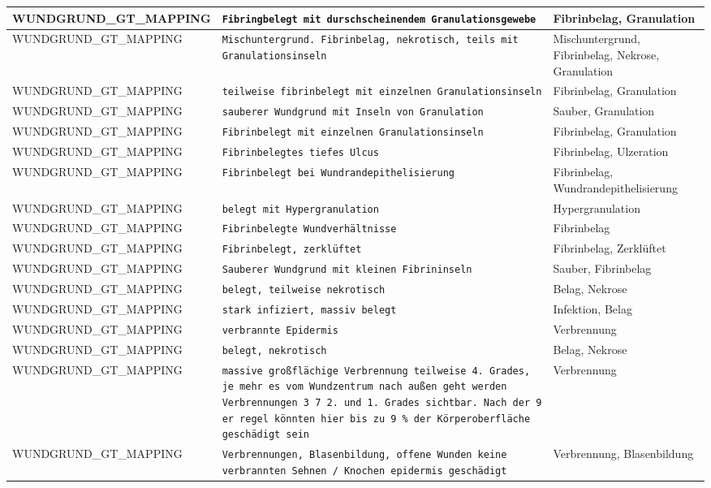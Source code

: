 \begin{longtable}{|p{3.5cm}|p{5cm}|p{6.5cm}|}
WUNDGRUND\_GT\_MAPPING & \texttt{Fibringbelegt mit durschscheinendem Granulationsgewebe} & Fibrinbelag, Granulation \\ \hline
WUNDGRUND\_GT\_MAPPING & \texttt{Mischuntergrund. Fibrinbelag, nekrotisch, teils mit Granulationsinseln} & Mischuntergrund, Fibrinbelag, Nekrose, Granulation \\ \hline
WUNDGRUND\_GT\_MAPPING & \texttt{teilweise fibrinbelegt mit einzelnen Granulationsinseln} & Fibrinbelag, Granulation \\ \hline
WUNDGRUND\_GT\_MAPPING & \texttt{sauberer Wundgrund mit Inseln von Granulation} & Sauber, Granulation \\ \hline
WUNDGRUND\_GT\_MAPPING & \texttt{Fibrinbelegt mit einzelnen Granulationsinseln} & Fibrinbelag, Granulation \\ \hline
WUNDGRUND\_GT\_MAPPING & \texttt{Fibrinbelegtes tiefes Ulcus} & Fibrinbelag, Ulzeration \\ \hline
WUNDGRUND\_GT\_MAPPING & \texttt{Fibrinbelegt bei Wundrandepithelisierung} & Fibrinbelag, Wundrandepithelisierung \\ \hline
WUNDGRUND\_GT\_MAPPING & \texttt{belegt mit Hypergranulation} & Hypergranulation \\ \hline
WUNDGRUND\_GT\_MAPPING & \texttt{Fibrinbelegte Wundverhältnisse} & Fibrinbelag \\ \hline
WUNDGRUND\_GT\_MAPPING & \texttt{Fibrinbelegt, zerklüftet} & Fibrinbelag, Zerklüftet \\ \hline
WUNDGRUND\_GT\_MAPPING & \texttt{Sauberer Wundgrund mit kleinen Fibrininseln} & Sauber, Fibrinbelag \\ \hline
WUNDGRUND\_GT\_MAPPING & \texttt{belegt, teilweise nekrotisch} & Belag, Nekrose \\ \hline
WUNDGRUND\_GT\_MAPPING & \texttt{stark infiziert, massiv belegt} & Infektion, Belag \\ \hline
WUNDGRUND\_GT\_MAPPING & \texttt{verbrannte  Epidermis} & Verbrennung \\ \hline
WUNDGRUND\_GT\_MAPPING & \texttt{belegt, nekrotisch} & Belag, Nekrose \\ \hline
WUNDGRUND\_GT\_MAPPING & \texttt{massive großflächige Verbrennung teilweise 4. Grades, je mehr es vom Wundzentrum nach außen geht werden Verbrennungen 3 7 2. und 1. Grades sichtbar. Nach der 9 er regel könnten hier bis zu 9 \% der Körperoberfläche geschädigt sein} & Verbrennung \\ \hline
WUNDGRUND\_GT\_MAPPING & \texttt{Verbrennungen, Blasenbildung, offene Wunden keine verbrannten Sehnen / Knochen  epidermis geschädigt} & Verbrennung, Blasenbildung \\ \hline

\end{longtable}
